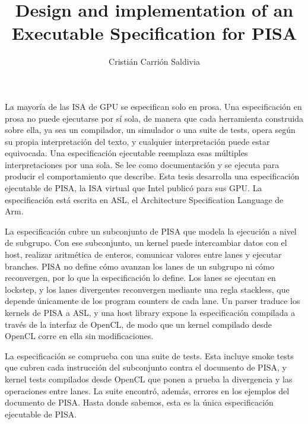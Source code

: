 \documentclass[english]{umemoria}
\author{Cristián Carrión Saldivia}
\title{Design and implementation of an Executable Specification for PISA}
\begin{document}
\frontmatter
\maketitle

\begin{resumen}
La mayoría de las ISA de GPU se especifican solo en prosa. Una
especificación en prosa no puede ejecutarse por sí sola, de manera que
cada herramienta construida sobre ella, ya sea un compilador, un
simulador o una suite de tests, opera según su propia interpretación
del texto, y cualquier interpretación puede estar equivocada. Una
especificación ejecutable reemplaza esas múltiples interpretaciones
por una sola. Se lee como documentación y se ejecuta para producir el
comportamiento que describe. Esta tesis desarrolla una especificación
ejecutable de PISA, la ISA virtual que Intel publicó para sus GPU. La
especificación está escrita en ASL, el Architecture Specification
Language de Arm.

La especificación cubre un subconjunto de PISA que modela la ejecución
a nivel de subgrupo. Con ese subconjunto, un kernel puede intercambiar
datos con el host, realizar aritmética de enteros, comunicar valores
entre lanes y ejecutar branches. PISA no define cómo avanzan los lanes
de un subgrupo ni cómo reconvergen, por lo que la especificación lo
define. Los lanes se ejecutan en lockstep, y los lanes divergentes
reconvergen mediante una regla stackless, que depende únicamente de
los program counters de cada lane. Un parser traduce los kernels de
PISA a ASL, y una host library expone la especificación compilada a
través de la interfaz de OpenCL, de modo que un kernel compilado desde
OpenCL corre en ella sin modificaciones.

La especificación se comprueba con una suite de tests. Esta incluye
smoke tests que cubren cada instrucción del subconjunto contra el
documento de PISA, y kernel tests compilados desde OpenCL que ponen a
prueba la divergencia y las operaciones entre lanes. La suite
encontró, además, errores en los ejemplos del documento de PISA. Hasta
donde sabemos, esta es la única especificación ejecutable de PISA.
\end{resumen}
\end{document}
